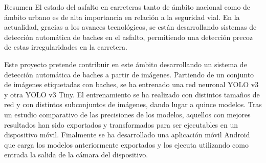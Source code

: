 \begin{poliabstract}{Resumen}
\noindent
El estado del asfalto en carreteras tanto de ámbito nacional como de ámbito urbano es de alta importancia en relación a la seguridad vial. En la actualidad, gracias a los avances tecnológicos, se están desarrollando sistemas de detección automática de baches en el asfalto, permitiendo una detección precoz de estas irregularidades en la carretera.

\doublespacing\singlespacing
\noindent
Este proyecto pretende contribuir en este ámbito desarrollando un sistema de detección automática de baches a partir de imágenes. Partiendo de un conjunto de imágenes etiquetadas con baches, se ha entrenado una red neuronal YOLO v3 y otra YOLO v3 Tiny. El entrenamiento se ha realizado con distintos tamaños de red y con distintos subconjuntos de imágenes, dando lugar a quince modelos. Tras un estudio comparativo de las precisiones de los modelos, aquellos con mejores resultados han sido exportados y transformados para ser ejecutables en un dispositivo móvil. Finalmente se ha desarrollado una aplicación móvil Android que carga los modelos anteriormente exportados y los ejecuta utilizando como entrada la salida de la cámara del dispositivo.
\end{poliabstract}